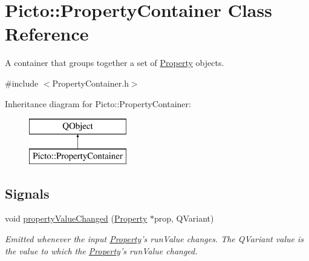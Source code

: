 \hypertarget{class_picto_1_1_property_container}{\section{Picto\-:\-:Property\-Container Class Reference}
\label{class_picto_1_1_property_container}
}


A container that groups together a set of \hyperlink{class_picto_1_1_property}{Property} objects.  




{\ttfamily \#include $<$Property\-Container.\-h$>$}

Inheritance diagram for Picto\-:\-:Property\-Container\-:\begin{figure}[H]
\begin{center}
\leavevmode
\includegraphics[height=2.000000cm]{class_picto_1_1_property_container}
\end{center}
\end{figure}
\subsection*{Signals}
\begin{DoxyCompactItemize}
\item 
void \hyperlink{class_picto_1_1_property_container_a1c236aa0e91082351b1636a775d5fe3c}{property\-Value\-Changed} (\hyperlink{class_picto_1_1_property}{Property} $\ast$prop, Q\-Variant)
\begin{DoxyCompactList}\small\item\em Emitted whenever the input \hyperlink{class_picto_1_1_property}{Property}'s run\-Value changes. The Q\-Variant value is the value to which the \hyperlink{class_picto_1_1_property}{Property}'s run\-Value changed. \end{DoxyCompactList}\end{DoxyCompactItemize}
